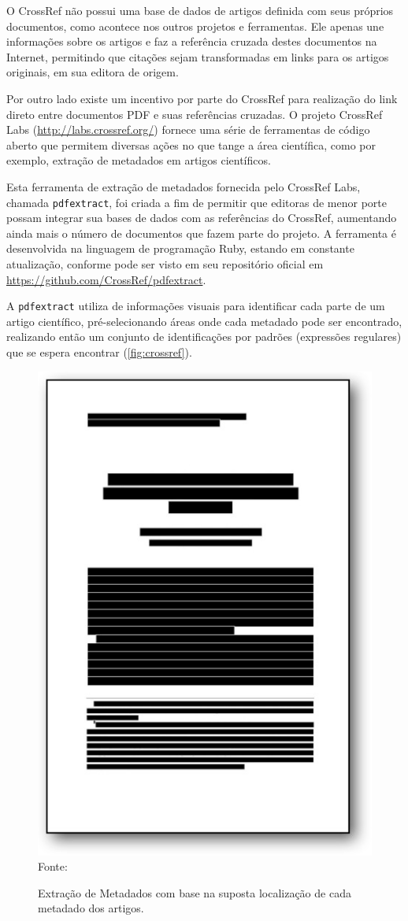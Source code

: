O CrossRef não possui uma base de dados de artigos definida com seus próprios documentos, como acontece nos outros projetos e ferramentas. Ele apenas une informações sobre os artigos e faz a referência cruzada destes documentos na Internet, permitindo que citações sejam transformadas em links para os artigos originais, em sua editora de origem.

Por outro lado existe um incentivo por parte do CrossRef para realização do link direto entre documentos PDF e suas referências cruzadas. O projeto CrossRef Labs (\url{http://labs.crossref.org/}) fornece uma série de ferramentas de código aberto que permitem diversas ações no que tange a área científica, como por exemplo, extração de metadados em artigos científicos.

Esta ferramenta de extração de metadados fornecida pelo CrossRef Labs, chamada \texttt{pdfextract}, foi criada a fim de permitir que editoras de menor porte possam integrar sua bases de dados com as referências do CrossRef, aumentando ainda mais o número de documentos que fazem parte do projeto. A ferramenta é desenvolvida na linguagem de programação Ruby, estando em constante atualização, conforme pode ser visto em seu repositório oficial em \url{https://github.com/CrossRef/pdfextract}.

A \texttt{pdfextract} utiliza de informações visuais para identificar cada parte de um artigo científico, pré-selecionando áreas onde cada metadado pode ser encontrado, realizando então um conjunto de identificações por padrões (expressões regulares) que se espera encontrar (\autoref{fig:crossref}).

\begin{figure}
    \centering
    \caption{Extração de Metadados com base na suposta localização de cada metadado dos artigos.}
    \label{fig:crossref}
    \includegraphics[width=0.6\linewidth]{./assets/images/crossref}
    \center\footnotesize{Fonte: \cite{CrossRef-2009}}
\end{figure}

